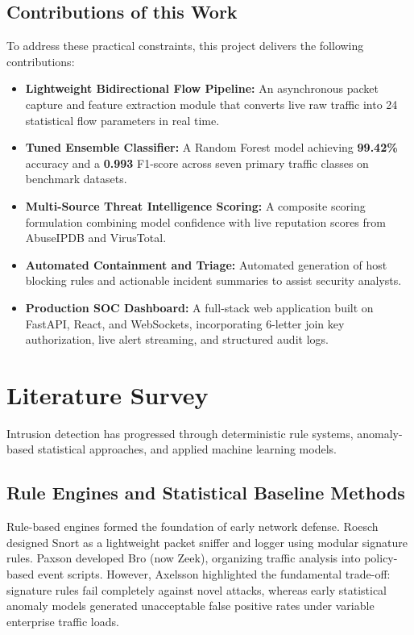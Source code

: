 \documentclass[conference]{IEEEtran}
\begin{document}
\subsection{Contributions of this Work}
To address these practical constraints, this project delivers the following contributions:
\begin{itemize}
    \item \textbf{Lightweight Bidirectional Flow Pipeline:} An asynchronous packet capture and feature extraction module that converts live raw traffic into 24 statistical flow parameters in real time.
    \item \textbf{Tuned Ensemble Classifier:} A Random Forest model achieving \textbf{99.42\%} accuracy and a \textbf{0.993} F1-score across seven primary traffic classes on benchmark datasets.
    \item \textbf{Multi-Source Threat Intelligence Scoring:} A composite scoring formulation combining model confidence with live reputation scores from AbuseIPDB and VirusTotal.
    \item \textbf{Automated Containment and Triage:} Automated generation of host blocking rules and actionable incident summaries to assist security analysts.
    \item \textbf{Production SOC Dashboard:} A full-stack web application built on FastAPI, React, and WebSockets, incorporating 6-letter join key authorization, live alert streaming, and structured audit logs.
\end{itemize}

\section{Literature Survey}

Intrusion detection has progressed through deterministic rule systems, anomaly-based statistical approaches, and applied machine learning models.

\subsection{Rule Engines and Statistical Baseline Methods}
Rule-based engines formed the foundation of early network defense. Roesch \cite{roesch1999} designed Snort as a lightweight packet sniffer and logger using modular signature rules. Paxson \cite{paxson1999} developed Bro (now Zeek), organizing traffic analysis into policy-based event scripts. However, Axelsson \cite{axelsson2000} highlighted the fundamental trade-off: signature rules fail completely against novel attacks, whereas early statistical anomaly models generated unacceptable false positive rates under variable enterprise traffic loads.
\end{document}
